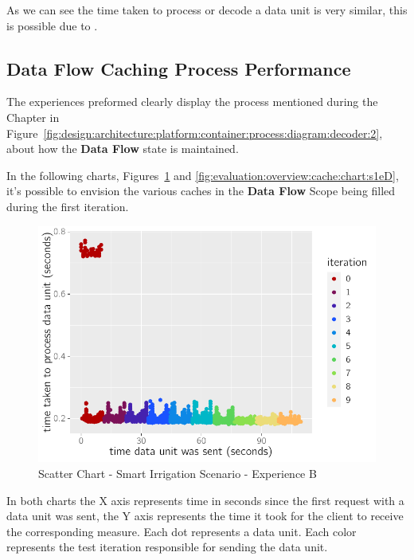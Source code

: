As we can see the time taken to process or decode a data unit is very similar, this is possible due to .

\subsection{Data Flow Caching Process Performance}
\label{subsubsec:evaluation:overview:cache}

The experiences preformed clearly display the process mentioned during the  Chapter in Figure~\ref{fig:design:architecture:platform:container:process:diagram:decoder:2}, about how the \textbf{Data Flow} state is maintained.

In the following charts, Figures~\ref{fig:evaluation:overview:cache:chart:s2eB} and \ref{fig:evaluation:overview:cache:chart:s1eD}, it's possible to envision the various caches in the \textbf{Data Flow} Scope being filled during the first iteration.

\begin{figure}[H]
    \centering
    \includegraphics[page=1]{assets/charts/s2eB.pdf}
    \caption[Scatter Chart - Smart Irrigation Scenario - Experience B]{Scatter Chart - Smart Irrigation Scenario - Experience B}
    \label{fig:evaluation:overview:cache:chart:s2eB}
 \end{figure}

 In both charts the X axis represents time in seconds since the first request with a data unit was sent, the Y axis represents the time it took for the client to receive the corresponding measure. Each dot represents a data unit.
 Each color represents the test iteration responsible for sending the data unit.
 
